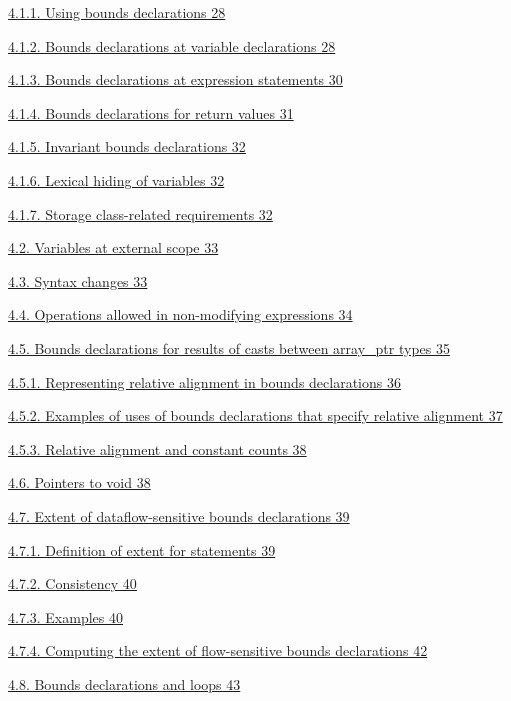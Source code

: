 \documentclass[]{article}
\begin{document}
\protect\hyperlink{ux5fToc440551859}{4.1.1. Using bounds declarations
28}

\protect\hyperlink{ux5fToc440551860}{4.1.2. Bounds declarations at
variable declarations 28}

\protect\hyperlink{ux5fToc440551861}{4.1.3. Bounds declarations at
expression statements 30}

\protect\hyperlink{ux5fToc440551862}{4.1.4. Bounds declarations for
return values 31}

\protect\hyperlink{ux5fToc440551863}{4.1.5. Invariant bounds
declarations 32}

\protect\hyperlink{ux5fToc440551864}{4.1.6. Lexical hiding of variables
32}

\protect\hyperlink{ux5fToc440551865}{4.1.7. Storage class-related
requirements 32}

\protect\hyperlink{ux5fToc440551866}{4.2. Variables at external scope
33}

\protect\hyperlink{ux5fToc440551867}{4.3. Syntax changes 33}

\protect\hyperlink{ux5fToc440551868}{4.4. Operations allowed in
non-modifying expressions 34}

\protect\hyperlink{ux5fToc440551869}{4.5. Bounds declarations for
results of casts between array\_ptr types 35}

\protect\hyperlink{ux5fToc440551870}{4.5.1. Representing relative
alignment in bounds declarations 36}

\protect\hyperlink{ux5fToc440551871}{4.5.2. Examples of uses of bounds
declarations that specify relative alignment 37}

\protect\hyperlink{ux5fToc440551872}{4.5.3. Relative alignment and
constant counts 38}

\protect\hyperlink{ux5fToc440551873}{4.6. Pointers to void 38}

\protect\hyperlink{ux5fToc440551874}{4.7. Extent of dataflow-sensitive
bounds declarations 39}

\protect\hyperlink{ux5fToc440551875}{4.7.1. Definition of extent for
statements 39}

\protect\hyperlink{ux5fToc440551876}{4.7.2. Consistency 40}

\protect\hyperlink{ux5fToc440551877}{4.7.3. Examples 40}

\protect\hyperlink{ux5fToc440551878}{4.7.4. Computing the extent of
flow-sensitive bounds declarations 42}

\protect\hyperlink{ux5fToc440551879}{4.8. Bounds declarations and loops
43}
\end{document}
